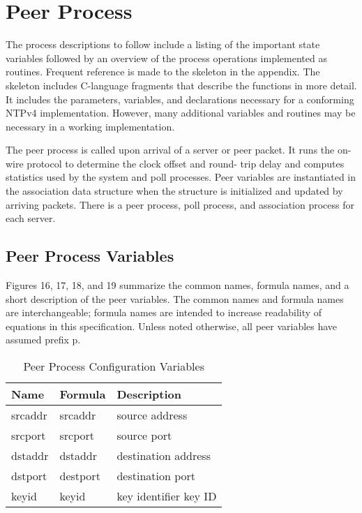 \chapter{Peer Process}
\label{section-9}

The process descriptions to follow include a listing of the important
state variables followed by an overview of the process operations
implemented as routines. Frequent reference is made to the skeleton
in the appendix. The skeleton includes C-language fragments that
describe the functions in more detail. It includes the parameters,
variables, and declarations necessary for a conforming NTPv4
implementation. However, many additional variables and routines may
be necessary in a working implementation.

The peer process is called upon arrival of a server or peer packet.
It runs the on-wire protocol to determine the clock offset and round-
trip delay and computes statistics used by the system and poll
processes. Peer variables are instantiated in the association data
structure when the structure is initialized and updated by arriving
packets. There is a peer process, poll process, and association
process for each server.

\section{Peer Process Variables}
\label{section-9-1}

Figures 16, 17, 18, and 19 summarize the common names, formula names,
and a short description of the peer variables. The common names and
formula names are interchangeable; formula names are intended to
increase readability of equations in this specification. Unless
noted otherwise, all peer variables have assumed prefix p.

\begin{table}[htb]
\center
\begin{tabular}{| l | l | l |}
\hline
Name & Formula & Description \\
\hline
\hline
srcaddr & srcaddr & source address \\
srcport & srcport & source port \\
dstaddr & dstaddr & destination address \\
dstport & destport & destination port \\
keyid & keyid & key identifier key ID \\
\hline
\end{tabular}
\caption{Peer Process Configuration Variables}
\label{peer_process_configuration_variables}
\end{table}

